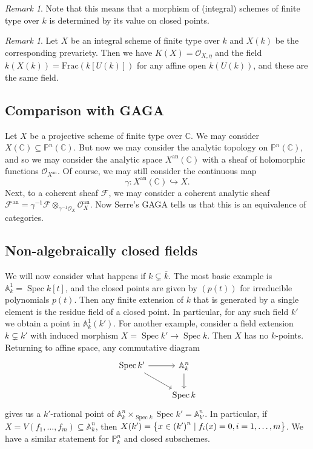 \documentclass[leqno, openany]{memoir}
\theoremstyle{definition}
\theoremstyle{remark}
\newtheorem{rmk}[thm]{Remark}
\theoremstyle{plain}
\theoremstyle{definition}
\theoremstyle{remark}
\newcommand{\A}{\mathbb{A}}
\newcommand{\C}{\mathbb{C}}
\renewcommand{\P}{\mathbb{P}}
\newcommand{\mc}[1]{\mathcal{#1}}
\newcommand{\mr}[1]{\mathrm{#1}}
\newcommand{\ol}[1]{\overline{#1}}
\DeclareMathOperator{\Spec}{Spec}
\begin{document}
\begin{rmk}
    Note that this means that a morphism of (integral) schemes of finite type over $k$ is determined by its value on closed points.
\end{rmk}

\begin{rmk}
    Let $X$ be an integral scheme of finite type over $k$ and $X(k)$ be the corresponding prevariety. Then we have $K(X) = \mc{O}_{X, \eta}$ and the field $k(X(k)) = \mr{Frac}(k[U(k)])$ for any affine open $k(U(k))$, and these are the same field.
\end{rmk}

\subsection{Comparison with GAGA}%
\label{sub:comparison_with_gaga}

Let $X$ be a projective scheme of finite type over $\C$. We may consider $X(\C) \subseteq \P^n(\C)$. But now we may consider the analytic topology on $\P^n(\C)$, and so we may consider the analytic space $X^{\mr{an}}(\C)$ with a sheaf of holomorphic functions $\mc{O}_{X^{\mr{an}}}$. Of course, we may still consider the continuous map 
\[ \gamma \colon X^{\mr{an}}(\C) \hookrightarrow X. \]
Next, to a coherent sheaf $\mc{F}$, we may consider a coherent analytic sheaf $\mc{F}^{\mr{an}} = \gamma^{-1} \mc{F} \otimes_{\gamma^{-1} \mc{O}_X} \mc{O}_X^{\mr{an}}$. Now Serre's GAGA tells us that this is an equivalence of categories.

\subsection{Non-algebraically closed fields}%
\label{sub:non_algebraically_closed_fields}

We will now consider what happens if $k \subsetneq \ol{k}$. The most basic example is $\A^1_k = \Spec k[t]$, and the closed points are given by $(p(t))$ for irreducible polynomials $p(t)$. Then any finite extension of $k$ that is generated by a single element is the residue field of a closed point. In particular, for any such field $k'$ we obtain a point in $\A^1_k(k')$. For another example, consider a field extension $k \subsetneq k'$ with induced morphism $X = \Spec k' \to \Spec k$. Then $X$ has no $k$-points. Returning to affine space, any commutative diagram
\begin{equation*}
\begin{tikzcd}
    \Spec k' \ar{r} \ar{dr} & \A^n_k \ar{d} \\
                            & \Spec k
\end{tikzcd}
\end{equation*}
gives us a $k'$-rational point of $\A^n_k \times_{\Spec k} \Spec k' = \A^n_{k'}$. In particular, if $X = V(f_1, \ldots, f_m) \subseteq \A^n_k$, then $X(k') = \qty{x \in {(k')}^n \mid f_i(x) = 0, i = 1, \ldots, m}$. We have a similar statement for $\P^n_k$ and closed subschemes.
\end{document}
